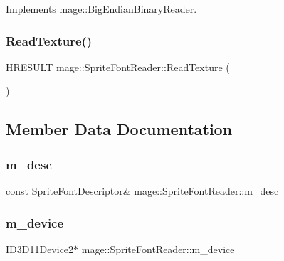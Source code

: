 Implements \hyperlink{classmage_1_1_big_endian_binary_reader_a723f28280c4e1343f42f41eea2b97015}{mage\+::\+Big\+Endian\+Binary\+Reader}.

\hypertarget{classmage_1_1_sprite_font_reader_a0ab2521309a82f1160e4839b8ca6e400}{}\label{classmage_1_1_sprite_font_reader_a0ab2521309a82f1160e4839b8ca6e400} 
\subsubsection{\texorpdfstring{Read\+Texture()}{ReadTexture()}}
{\footnotesize\ttfamily H\+R\+E\+S\+U\+LT mage\+::\+Sprite\+Font\+Reader\+::\+Read\+Texture (\begin{DoxyParamCaption}{ }\end{DoxyParamCaption})\hspace{0.3cm}{\ttfamily [protected]}}



\subsection{Member Data Documentation}
\hypertarget{classmage_1_1_sprite_font_reader_a6951665c0a5fda28ea6784945565cb6e}{}\label{classmage_1_1_sprite_font_reader_a6951665c0a5fda28ea6784945565cb6e} 
\subsubsection{\texorpdfstring{m\+\_\+desc}{m\_desc}}
{\footnotesize\ttfamily const \hyperlink{structmage_1_1_sprite_font_descriptor}{Sprite\+Font\+Descriptor}\& mage\+::\+Sprite\+Font\+Reader\+::m\+\_\+desc\hspace{0.3cm}{\ttfamily [private]}}

\hypertarget{classmage_1_1_sprite_font_reader_aa89bb54d21caf942e56780bf6e229810}{}\label{classmage_1_1_sprite_font_reader_aa89bb54d21caf942e56780bf6e229810} 
\subsubsection{\texorpdfstring{m\+\_\+device}{m\_device}}
{\footnotesize\ttfamily I\+D3\+D11\+Device2$\ast$ mage\+::\+Sprite\+Font\+Reader\+::m\+\_\+device\hspace{0.3cm}{\ttfamily [private]}}

